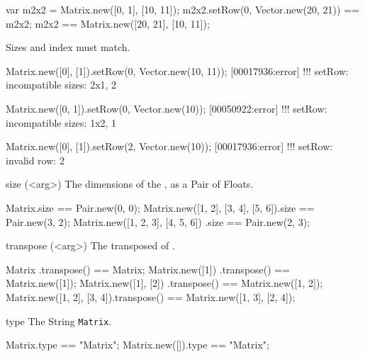 \begin{urbiscriptapi}
\begin{urbiassert}
var m2x2 = Matrix.new([0, 1], [10, 11]);
m2x2.setRow(0, Vector.new(20, 21)) == m2x2;
m2x2 == Matrix.new([20, 21], [10, 11]);
\end{urbiassert}

  Sizes and index must match.
\begin{urbiscript}
Matrix.new([0], [1]).setRow(0, Vector.new(10, 11));
[00017936:error] !!! setRow: incompatible sizes: 2x1, 2

Matrix.new([0, 1]).setRow(0, Vector.new(10));
[00050922:error] !!! setRow: incompatible sizes: 1x2, 1

Matrix.new([0], [1]).setRow(2, Vector.new(10));
[00017936:error] !!! setRow: invalid row: 2
\end{urbiscript}


\item[size](<arg>)%
  The dimensions of the \this, as a Pair of Floats.
\begin{urbiassert}
Matrix.size == Pair.new(0, 0);
Matrix.new([1, 2], [3, 4], [5, 6]).size == Pair.new(3, 2);
Matrix.new([1, 2, 3], [4, 5, 6])  .size == Pair.new(2, 3);
\end{urbiassert}


\item[transpose](<arg>)%
  The transposed of \this.
\begin{urbiassert}
Matrix                    .transpose() == Matrix;
Matrix.new([1])           .transpose() == Matrix.new([1]);
Matrix.new([1], [2])      .transpose() == Matrix.new([1, 2]);
Matrix.new([1, 2], [3, 4]).transpose() == Matrix.new([1, 3], [2, 4]);
\end{urbiassert}


\item[type]%
  The String \lstinline|Matrix|.
\begin{urbiassert}
Matrix.type         == "Matrix";
Matrix.new([]).type == "Matrix";
\end{urbiassert}
\end{urbiscriptapi}

